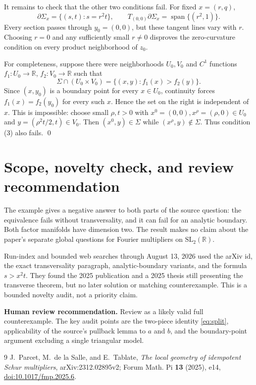 \documentclass[11pt]{article}
\newcommand{\R}{\mathbb R}
\newcommand{\1}{\mathbf 1}
\begin{document}
It remains to check that the other two conditions fail.  For fixed
$x=(r,q)$,
\[
  \partial\Sigma_x=\{(s,t):s=r^2t\},
  \qquad
  T_{(0,0)}\partial\Sigma_x
    =\operatorname{span}\{(r^2,1)\}.
\]
Every section passes through $y_0=(0,0)$, but these tangent lines vary with
$r$.  Choosing $r=0$ and any sufficiently small $r\ne0$ disproves the
zero-curvature condition on every product neighborhood of $z_0$.

For completeness, suppose there were neighborhoods $U_0,V_0$ and
$C^1$ functions $f_1:U_0\to\R$, $f_2:V_0\to\R$ such that
\[
  \Sigma\cap(U_0\times V_0)
  =\{(x,y):f_1(x)>f_2(y)\}.
\]
Since $(x,y_0)$ is a boundary point for every $x\in U_0$, continuity forces
$f_1(x)=f_2(y_0)$ for every such $x$.  Hence the set on the right is
independent of $x$.  This is impossible: choose small $\rho,t>0$ with
$x^0=(0,0),x^\rho=(\rho,0)\in U_0$ and
$y=(\rho^2t/2,t)\in V_0$.  Then $(x^0,y)\in\Sigma$ while
$(x^\rho,y)\notin\Sigma$.  Thus condition (3) also fails. \qed

\section*{Scope, novelty check, and review recommendation}

The example gives a negative answer to both parts of the source question:
the equivalence fails without transversality, and it can fail for an analytic
boundary.  Both factor manifolds have dimension two.  The result makes no
claim about the paper's separate global questions for Fourier multipliers on
$\mathrm{SL}_2(\R)$.

Run-index and bounded web searches through August 13, 2026 used the arXiv id,
the exact transversality paragraph, analytic-boundary variants, and the
formula $s>x^2t$.  They found the 2025 publication and a 2025 thesis still
presenting the transverse theorem, but no later solution or matching
counterexample.  This is a bounded novelty audit, not a priority claim.

\medskip
\noindent
\textbf{Human review recommendation.} Review as a likely valid full
counterexample.  The key audit points are the two-piece identity
\eqref{eq:split}, applicability of the source's pullback lemma to $a$ and
$b$, and the boundary-point argument excluding a single triangular model.

\begin{thebibliography}{9}
J.~Parcet, M.~de la Salle, and E.~Tablate,
\emph{The local geometry of idempotent Schur multipliers},
arXiv:2312.02895v2; Forum Math. Pi \textbf{13} (2025), e14,
\href{https://doi.org/10.1017/fmp.2025.6}{doi:10.1017/fmp.2025.6}.
\end{thebibliography}
\end{document}

